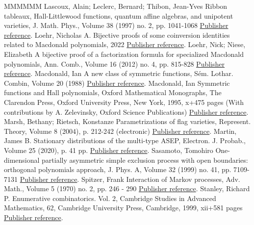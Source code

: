 \documentclass[11pt]{article}
\theoremstyle{definition}
\numberwithin{equation}{section}
\begin{document}
\begin{thebibliography}{MMMMMM}
 Lascoux, Alain; Leclerc, Bernard; Thibon, Jean-Yves Ribbon tableaux, Hall-Littlewood functions, quantum affine algebras, and unipotent varieties, J. Math. Phys., Volume 38 (1997) no. 2, pp. 1041-1068 \href{https://alco.centre-mersenne.org/articles/10.5802/alco.248/#LLT}{Publisher reference}.
 Loehr, Nicholas A. Bijective proofs of some coinversion identities related to Macdonald polynomials, 2022 \href{https://alco.centre-mersenne.org/articles/10.5802/alco.248/#Loehr}{Publisher reference}.
 Loehr, Nick; Niese, Elizabeth A bijective proof of a factorization formula for specialized Macdonald polynomials, Ann. Comb., Volume 16 (2012) no. 4, pp. 815-828 \href{https://alco.centre-mersenne.org/articles/10.5802/alco.248/#LoehrNiese}{Publisher reference}.
 Macdonald, Ian A new class of symmetric functions, Sém. Lothar. Combin, Volume 20 (1988) \href{https://alco.centre-mersenne.org/articles/10.5802/alco.248/#Mac88}{Publisher reference}.
 Macdonald, Ian Symmetric functions and Hall polynomials, Oxford Mathematical Monographs, The Clarendon Press, Oxford University Press, New York, 1995, x+475 pages (With contributions by A. Zelevinsky, Oxford Science Publications) \href{https://alco.centre-mersenne.org/articles/10.5802/alco.248/#Macdonald}{Publisher reference}.
 Marsh, Bethany; Rietsch, Konstanze Parametrizations of flag varieties, Represent. Theory, Volume 8 (2004), p. 212-242 (electronic) \href{https://alco.centre-mersenne.org/articles/10.5802/alco.248/#MarshRietsch}{Publisher reference}.
 Martin, James B. Stationary distributions of the multi-type ASEP, Electron. J. Probab., Volume 25 (2020), p. 41 pp. \href{https://alco.centre-mersenne.org/articles/10.5802/alco.248/#martin-2020}{Publisher reference}.
 Sasamoto, Tomohiro One-dimensional partially asymmetric simple exclusion process with open boundaries: orthogonal polynomials approach, J. Phys. A, Volume 32 (1999) no. 41, pp. 7109-7131 \href{https://alco.centre-mersenne.org/articles/10.5802/alco.248/#sasamoto-1999}{Publisher reference}.
 Spitzer, Frank Interaction of Markov processes, Adv. Math., Volume 5 (1970) no. 2, pp. 246 - 290 \href{https://alco.centre-mersenne.org/articles/10.5802/alco.248/#spitzer-1970}{Publisher reference}.
 Stanley, Richard P. Enumerative combinatorics. Vol. 2, Cambridge Studies in Advanced Mathematics, 62, Cambridge University Press, Cambridge, 1999, xii+581 pages \href{https://alco.centre-mersenne.org/articles/10.5802/alco.248/#stanley-ec2}{Publisher reference}.

\end{thebibliography}
\end{document}
